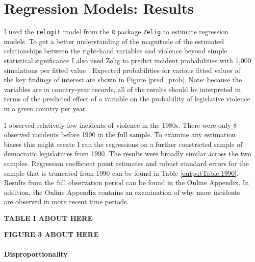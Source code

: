 \documentclass[a4paper]{article}\usepackage[]{graphicx}\usepackage[]{color}
\begin{document}


\section*{Regression Models: Results}

I used the {\tt{relogit}} model from the {\tt{R}} package {\tt{Zelig}} \citep{IMAIKingZelig2008} to estimate regression models. To get a better understanding of the magnitude of the estimated relationships between the right-hand variables and violence beyond simple statistical significance \citep{ward2010perils} I also used Zelig to predict incident probabilities with 1,000 simulations per fitted value \citep[]{King2002}. Expected probabilities for various fitted values of the key findings of interest are shown in Figure \ref{pred_prob}. Note: because the variables are in country-year records, all of the results should be interpreted in terms of the predicted effect of a variable on the probability of legislative violence in a given country per year.

I observed relatively few incidents of violence in the 1980s. There were only 8 observed incidents before 1990 in the full sample. To examine any estimation biases this might create I ran the regressions on a further constricted sample of democratic legislatures from 1990. The results were broadly similar across the two samples. Regression coefficient point estimates and robust standard errors for the sample that is truncated from 1990 can be found in Table \ref{outputTable.1990}. Results from the full observation period can be found in the Online Appendix. In addition, the Online Appendix contains an examination of why more incidents are observed in more recent time periods.

\vspace{0.5cm}

\textbf{TABLE I ABOUT HERE}

\vspace{0.5cm}

\textbf{FIGURE 3 ABOUT HERE}

\vspace{0.5cm}


\paragraph{Disproportionality}
\end{document}
